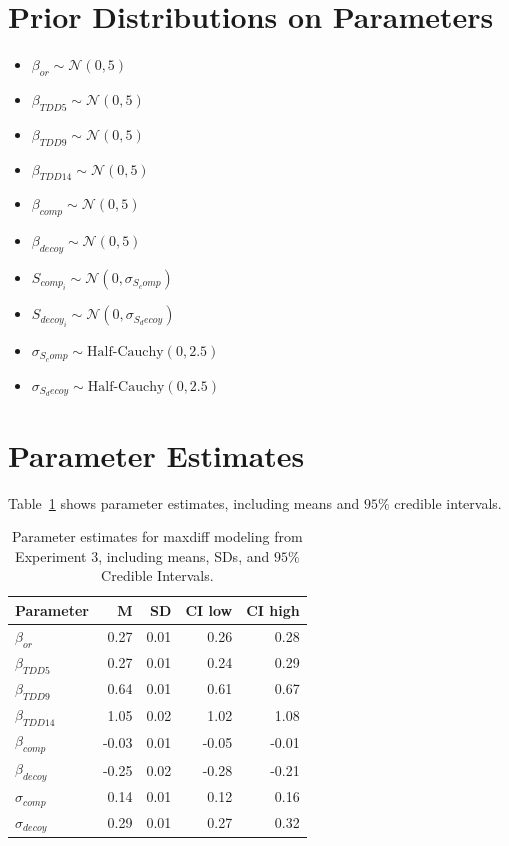 \section{Prior Distributions on Parameters}
\begin{itemize}
    \item $\beta_{or} \sim \mathcal{N}(0, 5)$
    \item $\beta_{TDD5} \sim \mathcal{N}(0, 5)$
    \item $\beta_{TDD9} \sim \mathcal{N}(0, 5)$
    \item $\beta_{TDD14} \sim \mathcal{N}(0, 5)$
    \item $\beta_{comp} \sim \mathcal{N}(0, 5)$
    \item $\beta_{decoy} \sim \mathcal{N}(0, 5)$
    \item $S_{comp_i} \sim \mathcal{N}(0, \sigma_{S_comp})$
    \item $S_{decoy_i} \sim \mathcal{N}(0, \sigma_{S_decoy})$
    \item $\sigma_{S_comp} \sim \text{Half-Cauchy}(0, 2.5)$
    \item $\sigma_{S_decoy} \sim \text{Half-Cauchy}(0, 2.5)$
\end{itemize}

\section{Parameter Estimates}
Table~\ref{tab:maxdiff_params} shows parameter estimates, including means and $95\%$ credible intervals. 
\begin{table}[ht]
    \centering
    \begin{tabular}{lrrrr}
        \toprule
        Parameter & M & SD & CI low & CI high \\
        \midrule
        $\beta_{or}$ & 0.27 & 0.01 & 0.26 & 0.28\\
        $\beta_{TDD5}$ & 0.27 & 0.01 & 0.24 & 0.29\\
        $\beta_{TDD9}$ & 0.64 & 0.01 & 0.61 & 0.67\\
        $\beta_{TDD14}$ & 1.05 & 0.02 & 1.02 & 1.08\\
        $\beta_{comp}$ & -0.03 & 0.01 & -0.05 & -0.01\\
        $\beta_{decoy}$ & -0.25 & 0.02 & -0.28 & -0.21\\
        $\sigma_{comp}$ & 0.14 & 0.01 & 0.12 & 0.16 \\
        $\sigma_{decoy}$ & 0.29 & 0.01 & 0.27 & 0.32 \\
        \bottomrule 
    \end{tabular}
    \caption{Parameter estimates for maxdiff modeling from Experiment 3, including means, SDs, and $95\%$ Credible Intervals.}
    \label{tab:maxdiff_params}
 \end{table}

